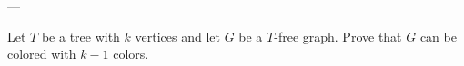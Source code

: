 
---

Let $T$ be a tree with $k$ vertices and let $G$ be a $T$-free graph.
Prove that $G$ can be colored with $k-1$ colors.
